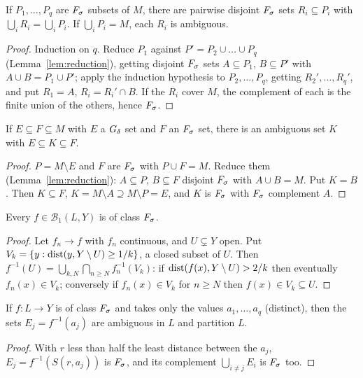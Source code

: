 \begin{corollary}\label{cor:reduction-finite}
If $P_1,\dots,P_q$ are $F_\sigma$ subsets of $M$, there are pairwise disjoint $F_\sigma$ sets $R_i\subseteq P_i$
with $\bigcup_iR_i=\bigcup_iP_i$. If $\bigcup_iP_i=M$, each $R_i$ is ambiguous.
\end{corollary}
\begin{proof}
Induction on $q$. Reduce $P_1$ against $P'=P_2\cup\dots\cup P_q$ (Lemma~\ref{lem:reduction}), getting
disjoint $F_\sigma$ sets $A\subseteq P_1$, $B\subseteq P'$ with $A\cup B=P_1\cup P'$; apply the induction
hypothesis to $P_2,\dots,P_q$, getting $R_2',\dots,R_q'$, and put $R_1=A$, $R_i=R_i'\cap B$. If the $R_i$
cover $M$, the complement of each is the finite union of the others, hence $F_\sigma$.
\end{proof}

\begin{theorem}\label{thm:sierpinski}
If $E\subseteq F\subseteq M$ with $E$ a $G_\delta$ set and $F$ an $F_\sigma$ set, there is an ambiguous set
$K$ with $E\subseteq K\subseteq F$.
\end{theorem}
\begin{proof}
$P=M\setminus E$ and $F$ are $F_\sigma$ with $P\cup F=M$. Reduce them (Lemma~\ref{lem:reduction}):
$A\subseteq P$, $B\subseteq F$ disjoint $F_\sigma$ with $A\cup B=M$. Put $K=B$. Then $K\subseteq F$,
$K=M\setminus A\supseteq M\setminus P=E$, and $K$ is $F_\sigma$ with $F_\sigma$ complement $A$.
\end{proof}

\begin{lemma}\label{lem:baire1-fsigma}
Every $f\in\mathcal B_1(L,Y)$ is of class $F_\sigma$.
\end{lemma}
\begin{proof}
Let $f_n\to f$ with $f_n$ continuous, and $U\subsetneq Y$ open. Put
$V_k=\{y:\operatorname{dist}(y,Y\setminus U)\ge1/k\}$, a closed subset of $U$. Then
$f^{-1}(U)=\bigcup_{k,N}\bigcap_{n\ge N}f_n^{-1}(V_k)$: if $\operatorname{dist}(f(x),Y\setminus U)>2/k$ then
eventually $f_n(x)\in V_k$; conversely if $f_n(x)\in V_k$ for $n\ge N$ then $f(x)\in V_k\subseteq U$.
\end{proof}

\begin{lemma}\label{lem:finite-valued}
If $f:L\to Y$ is of class $F_\sigma$ and takes only the values $a_1,\dots,a_q$ (distinct), then the sets
$E_j=f^{-1}(a_j)$ are ambiguous in $L$ and partition $L$.
\end{lemma}
\begin{proof}
With $r$ less than half the least distance between the $a_j$, $E_j=f^{-1}(S(r,a_j))$ is $F_\sigma$, and its
complement $\bigcup_{i\ne j}E_i$ is $F_\sigma$ too.
\end{proof}

